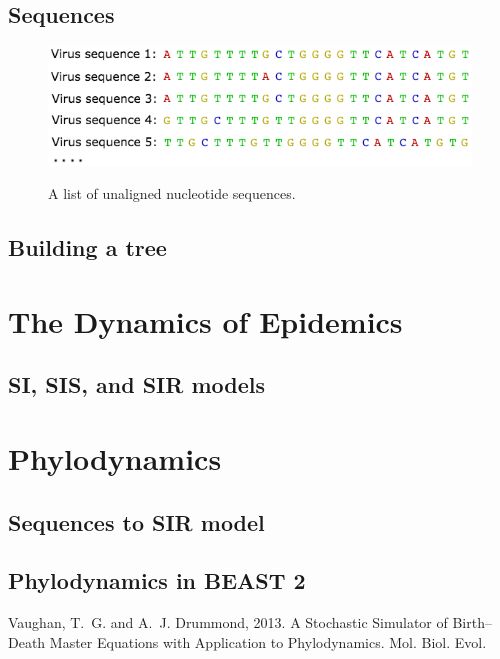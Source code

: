 \documentclass{scrartcl}
\begin{document}


\subsection{Sequences}

\begin{figure}[H] 
\center
{\includegraphics[width=0.7\linewidth]{FluSequence0.png}}
\caption{A list of unaligned nucleotide sequences.}
\label{sequences}
\end{figure}

\subsection{Building a tree}



\section{The Dynamics of Epidemics}

\subsection{SI, SIS, and SIR models}

\section{Phylodynamics}

\subsection{Sequences to SIR model}

\subsection{Phylodynamics in BEAST 2}

\newpage
\begin{thebibliography}{99} %

{\sc Vaughan, T.~G.} and {\sc A.~J. Drummond}, 2013.
A Stochastic Simulator of Birth–Death Master Equations with Application to Phylodynamics.
\newblock Mol. Biol. Evol.
 
\end{thebibliography}

\end{document}
